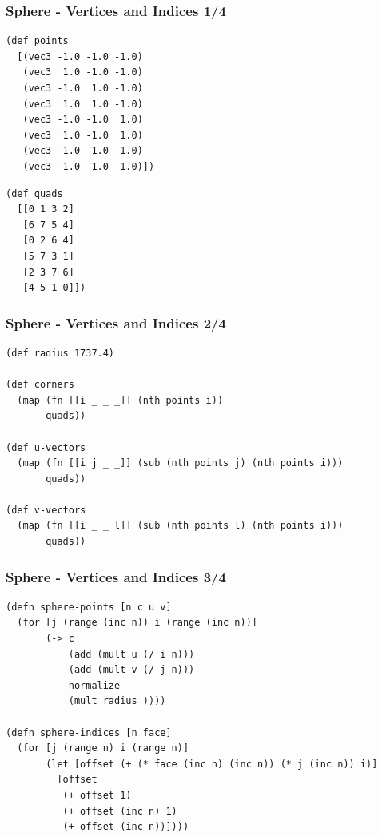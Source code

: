 \documentclass[aspectratio=169,11pt,xcolor=dvipsnames]{beamer}
\begin{document}
\begin{frame}[fragile]
  \frametitle{Sphere {-} Vertices and Indices 1/4}
  \begin{minipage}[t]{.48\textwidth}
    \begin{verbatim}
(def points
  [(vec3 -1.0 -1.0 -1.0)
   (vec3  1.0 -1.0 -1.0)
   (vec3 -1.0  1.0 -1.0)
   (vec3  1.0  1.0 -1.0)
   (vec3 -1.0 -1.0  1.0)
   (vec3  1.0 -1.0  1.0)
   (vec3 -1.0  1.0  1.0)
   (vec3  1.0  1.0  1.0)])
    \end{verbatim}
  \end{minipage}
  \begin{minipage}[t]{.48\textwidth}
    \begin{verbatim}
(def quads
  [[0 1 3 2]
   [6 7 5 4]
   [0 2 6 4]
   [5 7 3 1]
   [2 3 7 6]
   [4 5 1 0]])
    \end{verbatim}
  \end{minipage}
\end{frame}

\begin{frame}[fragile]
  \frametitle{Sphere {-} Vertices and Indices 2/4}
  \begin{verbatim}
(def radius 1737.4)

(def corners
  (map (fn [[i _ _ _]] (nth points i))
       quads))

(def u-vectors
  (map (fn [[i j _ _]] (sub (nth points j) (nth points i)))
       quads))

(def v-vectors
  (map (fn [[i _ _ l]] (sub (nth points l) (nth points i)))
       quads))
  \end{verbatim}
\end{frame}

\begin{frame}[fragile]
  \frametitle{Sphere {-} Vertices and Indices 3/4}
  \begin{verbatim}
(defn sphere-points [n c u v]
  (for [j (range (inc n)) i (range (inc n))]
       (-> c
           (add (mult u (/ i n)))
           (add (mult v (/ j n)))
           normalize
           (mult radius ))))

(defn sphere-indices [n face]
  (for [j (range n) i (range n)]
       (let [offset (+ (* face (inc n) (inc n)) (* j (inc n)) i)]
         [offset
          (+ offset 1)
          (+ offset (inc n) 1)
          (+ offset (inc n))])))
  \end{verbatim}
\end{frame}
\end{document}
